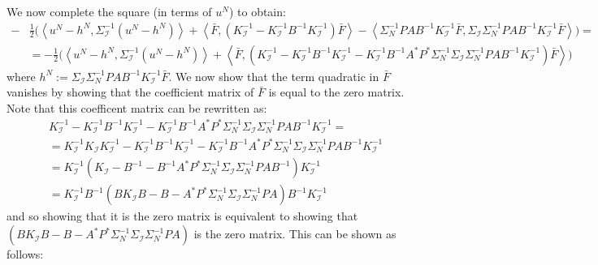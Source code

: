 We now complete the square (in terms of $u^{N}$) to obtain:
\begin{align}
    -&\frac{1}{2}\Big(\left\langle u^{N}-h^{N},\Sigma_{\mathcal{I}}^{-1}(u^{N}-h^{N}) \right\rangle + \left\langle \bar{F}, (K_{\mathcal{I}}^{-1}-K_{\mathcal{I}}^{-1}B^{-1}K_{\mathcal{I}}^{-1})\bar{F} \right\rangle - \left\langle \Sigma_{N}^{-1}PAB^{-1}K_{\mathcal{I}}^{-1}\bar{F},\Sigma_{\mathcal{I}}\Sigma_{N}^{-1}PAB^{-1}K_{\mathcal{I}}^{-1}\bar{F} \right\rangle \Big) = \nonumber \\
    &=-\frac{1}{2}\Big(\left\langle u^{N}-h^{N},\Sigma_{\mathcal{I}}^{-1}(u^{N}-h^{N}) \right\rangle + \left\langle \bar{F}, (K_{\mathcal{I}}^{-1}-K_{\mathcal{I}}^{-1}B^{-1}K_{\mathcal{I}}^{-1}-K_{\mathcal{I}}^{-1}B^{-1}A^{*}P^{*}\Sigma_{N}^{-1}\Sigma_{\mathcal{I}}\Sigma_{N}^{-1}PAB^{-1}K_{\mathcal{I}}^{-1})\bar{F} \right\rangle\Big)
\end{align}
where $h^{N}:=\Sigma_{\mathcal{I}}\Sigma_{N}^{-1}PAB^{-1}K_{\mathcal{I}}^{-1}\bar{F}$. We now show that the term quadratic in $\bar{F}$ vanishes by showing that the coefficient matrix of $\bar{F}$ is equal to the zero matrix. Note that this coefficent matrix can be rewritten as:
\begin{align*}
    &K_{\mathcal{I}}^{-1}-K_{\mathcal{I}}^{-1}B^{-1}K_{\mathcal{I}}^{-1}-K_{\mathcal{I}}^{-1}B^{-1}A^{*}P^{*}\Sigma_{N}^{-1}\Sigma_{\mathcal{I}}\Sigma_{N}^{-1}PAB^{-1}K_{\mathcal{I}}^{-1} = \\
    &=K_{\mathcal{I}}^{-1}K_{\mathcal{I}}K_{\mathcal{I}}^{-1}-K_{\mathcal{I}}^{-1}B^{-1}K_{\mathcal{I}}^{-1}-K_{\mathcal{I}}^{-1}B^{-1}A^{*}P^{*}\Sigma_{N}^{-1}\Sigma_{\mathcal{I}}\Sigma_{N}^{-1}PAB^{-1}K_{\mathcal{I}}^{-1} \\
    &= K_{\mathcal{I}}^{-1}(K_{\mathcal{I}}-B^{-1}-B^{-1}A^{*}P^{*}\Sigma_{N}^{-1}\Sigma_{\mathcal{I}}\Sigma_{N}^{-1}PAB^{-1})K_{\mathcal{I}}^{-1} \\
    &=K_{\mathcal{I}}^{-1}B^{-1}(BK_{\mathcal{I}}B-B-A^{*}P^{*}\Sigma_{N}^{-1}\Sigma_{\mathcal{I}}\Sigma_{N}^{-1}PA)B^{-1}K_{\mathcal{I}}^{-1}
\end{align*}
and so showing that it is the zero matrix is equivalent to showing that $(BK_{\mathcal{I}}B-B-A^{*}P^{*}\Sigma_{N}^{-1}\Sigma_{\mathcal{I}}\Sigma_{N}^{-1}PA)$ is the zero matrix. This can be shown as follows:
